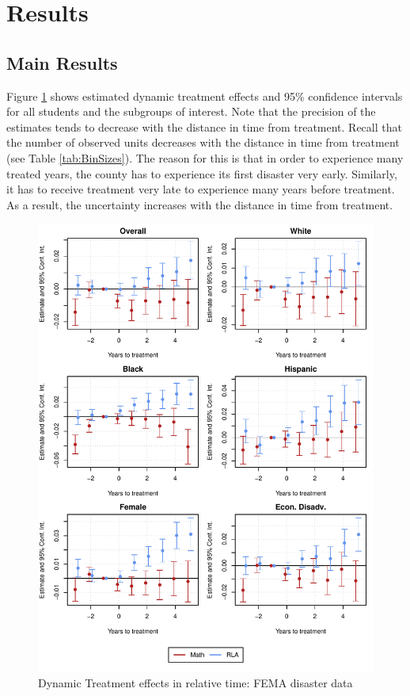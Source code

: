 \section{Results} \label{Results}

\subsection{Main Results}

Figure \ref{ResultsPlot} shows estimated dynamic treatment effects and 95\% confidence intervals for all students and the subgroups of interest. Note that the precision of the estimates tends to decrease with the distance in time from treatment. Recall that the number of observed units decreases with the distance in time from treatment (see Table \ref{tab:BinSizes}). The reason for this is that in order to experience many treated years, the county has to experience its first disaster very early. Similarly, it has to receive treatment very late to experience many years before treatment. As a result, the uncertainty increases with the distance in time from treatment.

\begin{figure}[!h]
	\centering
	\includegraphics[scale=1]{"../Code & Data/ResultsPlot.pdf"}
	\caption{Dynamic Treatment effects in relative time: FEMA disaster data}
	\label{ResultsPlot}
\end{figure}

